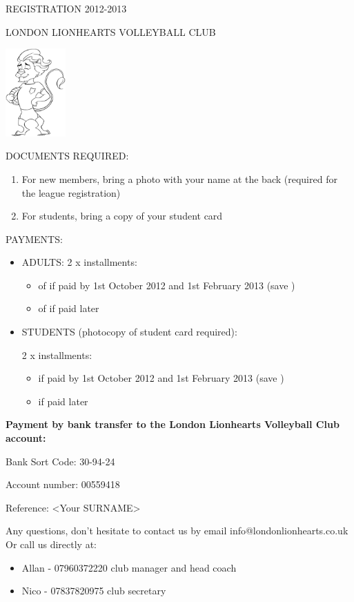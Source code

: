 \normalsize
\begin{center}
REGISTRATION 2012-2013

LONDON LIONHEARTS VOLLEYBALL CLUB
\vspace{0.5cm}

\includegraphics[width=2.3cm]{lions.png}
\end{center}

DOCUMENTS REQUIRED:
\begin{enumerate}
  \item For new members, bring a photo with your name at the back
(required for the league registration)
 \item For students, bring a copy of your student card
\end{enumerate}


PAYMENTS:
\begin{itemize}
\item ADULTS:
2 x installments:
\begin{itemize}
  \item of  if paid by 1st October 2012 and 1st February 2013 (save )
  \item of  if paid later
\end{itemize}

\item STUDENTS (photocopy of student card required):

2 x installments:
\begin{itemize}
  \item {} if paid by 1st October 2012 and 1st February 2013 (save )
  \item {} if paid later
\end{itemize}
\end{itemize}

{\bfseries Payment by bank transfer to the London Lionhearts Volleyball Club account:}

Bank Sort Code: 30-94-24

Account number: 00559418

Reference: <Your SURNAME>

Any questions, don't hesitate to contact us by email info@londonlionhearts.co.uk
Or call us directly at:

\begin{itemize}
  \item Allan - 07960372220	club manager and head coach
  \item Nico - 07837820975	club secretary
\end{itemize}
\newpage


